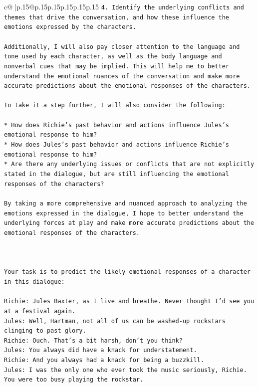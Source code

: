 \documentclass{article}
\begin{document}
{\begin{supertabular}{c@{$\;$}|p{.15\linewidth}@{}p{.15\linewidth}p{.15\linewidth}p{.15\linewidth}p{.15\linewidth}p{.15\linewidth}}
{{{\texttt{4. Identify the underlying conflicts and themes that drive the conversation, and how these influence the emotions expressed by the characters.} \\
\\ 
\texttt{Additionally, I will also pay closer attention to the language and tone used by each character, as well as the body language and nonverbal cues that may be implied. This will help me to better understand the emotional nuances of the conversation and make more accurate predictions about the emotional responses of the characters.} \\
\\ 
\texttt{To take it a step further, I will also consider the following:} \\
\\ 
\texttt{* How does Richie's past behavior and actions influence Jules's emotional response to him?} \\
\texttt{* How does Jules's past behavior and actions influence Richie's emotional response to him?} \\
\texttt{* Are there any underlying issues or conflicts that are not explicitly stated in the dialogue, but are still influencing the emotional responses of the characters?} \\
\\ 
\texttt{By taking a more comprehensive and nuanced approach to analyzing the emotions expressed in the dialogue, I hope to better understand the underlying forces at play and make more accurate predictions about the emotional responses of the characters.} \\
\\ 
\\ 
\\ 
\texttt{Your task is to predict the likely emotional responses of a character in this dialogue:} \\
\\ 
\texttt{Richie: Jules Baxter, as I live and breathe. Never thought I'd see you at a festival again.} \\
\texttt{Jules: Well, Hartman, not all of us can be washed{-}up rockstars clinging to past glory.} \\
\texttt{Richie: Ouch. That's a bit harsh, don't you think?} \\
\texttt{Jules: You always did have a knack for understatement.} \\
\texttt{Richie: And you always had a knack for being a buzzkill. } \\
\texttt{Jules: I was the only one who ever took the music seriously, Richie. You were too busy playing the rockstar.} \\
}}}
\end{supertabular}}
\end{document}

